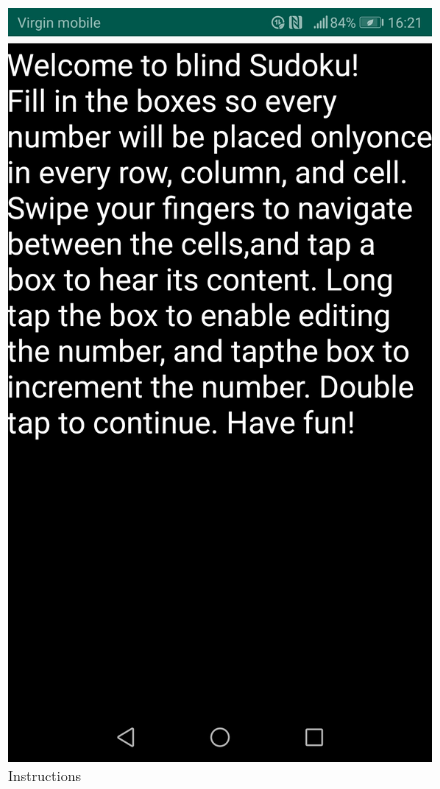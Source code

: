 \documentclass[a4paper,twoside,12pt]{book}
\begin{document}
\begin{figure}[H]
\centering
\begin{minipage}{.5\textwidth}
  \centering
  \includegraphics[width=.8\linewidth]{instructions.jpg}
  \caption{Instructions}
  \label{fig:Game instructions}
\end{minipage}%
\begin{minipage}{.5\textwidth}
  \centering

\end{minipage}
\end{figure}
\end{document}
